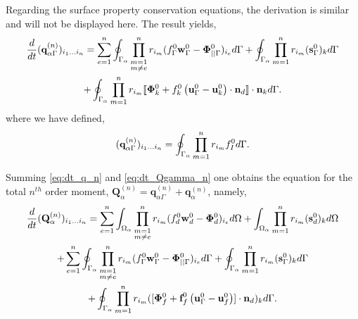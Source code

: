 Regarding the surface property conservation equations, the derivation is similar and will not be displayed here. 
The result yields, 
\begin{multline}
    \ddt {(\textbf{q}_{\alpha\Gamma}^{(n)})_{i_1\ldots i_n}}
    = \sum_{e=1}^{n} 
    \intS{
        \prod^{n}_{\substack{ m=1 \\m \neq e}} r_{i_m} (f_\Gamma^0\textbf{w}_\Gamma^0 - \bm\Phi_{||\Gamma}^0)_{i_e}
    }
    + \intS{ \pri{1}{n} (\textbf{s}_\Gamma^0)_k }
    \\
    +\intS{ \pri{1}{n} \Jump{\bm\Phi_k^0 + f_k^0 \left(\textbf{u}_\Gamma^0 - \textbf{u}_k^0\right)\cdot \textbf{n}_d}}.
    \label{eq:dt_Qgamma_n}
\end{multline}
where we have defined, 
\begin{equation*}
    (\textbf{q}_{\alpha\Gamma}^{(n)})_{i_1\ldots i_n}
    = \oint_{\Gamma_{\alpha}} 
    \prod_{m=1}^{n} r_{i_m} f_I^0 
     d\Gamma. 
\end{equation*}

Summing \ref{eq:dt_q_n} and \ref{eq:dt_Qgamma_n} one obtains the equation for the total $n^{th}$ order moment, $\textbf{Q}_{\alpha}^{(n)} = \textbf{q}_{\alpha\Gamma}^{(n)}+\textbf{q}_{\alpha}^{(n)}$, namely, 
\begin{multline}
    \ddt {(\textbf{Q}_{\alpha}^{(n)})_{i_1\ldots i_n}}
    = 
    \sum_{e=1}^{n} 
    \intO{
        \prod^{n}_{\substack{ m=1 \\m \neq e}} r_{i_m} (f_d^0\textbf{w}_d^0  - \bm\Phi_d^0)_{i_e}
    }
    + \intO{ \pri{1}{n} (\textbf{s}_d^0)_k }\\
    +     
    \sum_{e=1}^{n} 
    \intS{
        \prod^{n}_{\substack{ m=1 \\m \neq e}} r_{i_m} (f_\Gamma^0\textbf{w}_\Gamma^0 - \bm\Phi_{||\Gamma}^0)_{i_e}
    }
    + \intS{ \pri{1}{n} (\textbf{s}_\Gamma^0)_k }
    \\
    +\intS{ \pri{1}{n} ([\bm\Phi_f^0 + \textbf{f}_f^0 \left(\textbf{u}_\Gamma^0 - \textbf{u}_f^0\right)]\cdot \textbf{n}_d)_k }. 
    \label{eq:dt_Q_n}
\end{multline}


